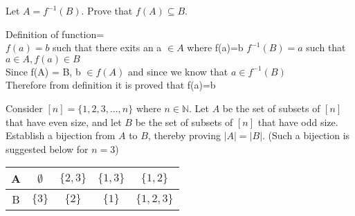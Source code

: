 \documentclass[addpoints]{exam}
\begin{document}
\begin{questions}
\begin{parts}
\begin{solution}
\begin{subparts}
  \end{subparts}

    
  \end{solution}

\end{parts}

\question[15] Let $A = f^{-1}(B)$. Prove that $f(A) \subseteq B$.
  \begin{solution}
    Definition of function= \\
    $f(a) = b $ such that there exits an a $\in A$ where f(a)=b 
    $f^{-1}(B) = a$ such that $a \in A , f(a) \in B $\\
    Since f(A) = B, b $\in f(A) $ and since we know that  $a \in f^{-1}(B) $\\ Therefore from definition it is proved that f(a)=b
    
    
    
    
    
  \end{solution}

\question[15] Consider $[n] = \{1,2,3,...,n\}$ where $n \in \mathbb{N}$. Let $A$ be the set of subsets of $[n]$ that have even size, and let $B$ be the set of subsets of $[n]$ that have odd size. Establish a bijection from $A$ to $B$, thereby proving $|A| = |B|$. (Such a bijection is suggested below for $n = 3$) 

\begin{center}

  \begin{tabular}{ |c || c | c | c |c |}
    \hline
 A & $\emptyset$ & $\{2,3\}$ & $\{1,3\}$ & $\{1,2\}$ \\ \hline
 B & $\{3\}$ & $\{2\}$ & $\{1\}$ & $\{1,2,3\}$\\\hline
\end{tabular}
\end{center}


\end{questions}
\end{document}

